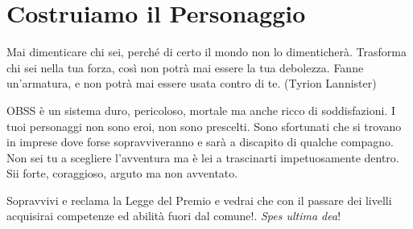 \section{Costruiamo il Personaggio}

\begin{changemargin}{0.3cm}{0.3cm}\begin{enfasi}{
Mai dimenticare chi sei, perché di certo il mondo non lo dimenticherà. Trasforma chi sei nella tua forza, così non potrà mai essere la tua debolezza. Fanne un'armatura, e non potrà mai essere usata contro di te. (Tyrion Lannister)
}\end{enfasi}\end{changemargin}\medskip

OBSS è un sistema duro, pericoloso, mortale ma anche ricco di soddisfazioni. I tuoi personaggi non sono eroi, non sono prescelti. Sono sfortunati che si trovano in imprese dove forse sopravviveranno e sarà a discapito di qualche compagno. Non sei tu a scegliere l'avventura ma è lei a trascinarti impetuosamente dentro. Sii forte, coraggioso, arguto ma non avventato. 

Sopravvivi e reclama la Legge del Premio e vedrai che con il passare dei livelli acquisirai competenze ed abilità fuori dal comune!. \emph{Spes ultima dea}!

